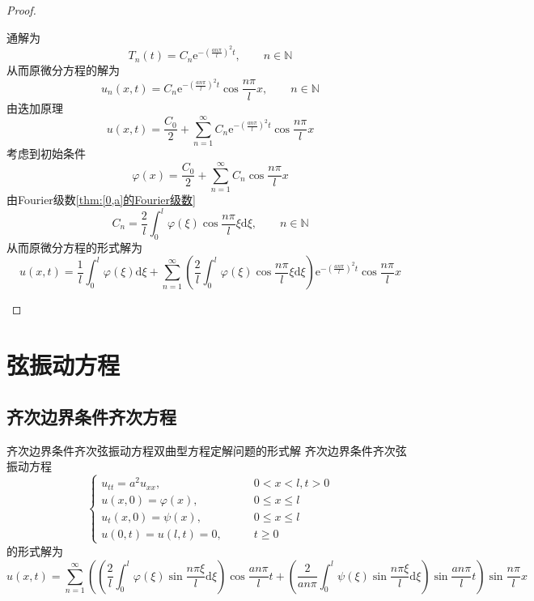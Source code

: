 \documentclass[lang = cn, scheme = chinese, thmcnt = section]{elegantbook}
\newcommand{\N}{\mathbb{N}}            %
\newcommand{\dd}{\mathrm{d}}           %
\newcommand{\ee}[1]{\mathrm{e}^{#1}}   %
\begin{document}
\begin{proof}
\begin{enumerate}
$$		$$
		通解为
		$$
		T_n(t)=C_n\ee{-\left(\frac{an\pi}{l}\right)^2t},\qquad n\in\N
		$$
		从而原微分方程的解为
		$$
		u_n(x,t)
		=C_n\ee{-\left(\frac{an\pi}{l}\right)^2t}\cos\frac{n\pi}{l}x,\qquad 
		n\in\N
		$$
		由迭加原理
		$$
		u(x,t)=\frac{C_0}{2}+\sum_{n=1}^{\infty}C_n\ee{-\left(\frac{an\pi}{l}\right)^2t}\cos\frac{n\pi}{l}x
		$$
		考虑到初始条件
		$$
		\varphi(x)=\frac{C_0}{2}+\sum_{n=1}^{\infty}C_n\cos\frac{n\pi}{l}x
		$$
		由Fourier级数\ref{thm:[0,a]的Fourier级数}
		$$
		C_n=\frac{2}{l}\int_0^l\varphi(\xi)\cos\frac{n\pi }{l}\xi\dd \xi,\qquad n\in\N
		$$
		从而原微分方程的形式解为
		$$
		u(x,t)=\frac{1}{l}\int_0^l\varphi(\xi)\dd \xi+\sum_{n=1}^{\infty}\left(\frac{2}{l}\int_0^l\varphi(\xi)\cos\frac{n\pi }{l}\xi\dd \xi\right)\ee{-\left(\frac{an\pi}{l}\right)^2t}\cos\frac{n\pi}{l}x
		$$
	\end{enumerate}
\end{proof}

\section{弦振动方程}

\subsection{齐次边界条件齐次方程}

\begin{theorem}{齐次边界条件齐次弦振动方程}{双曲型方程定解问题的形式解}
	齐次边界条件齐次弦振动方程
	$$
	\begin{cases}
		u_{tt}=a^2u_{xx},\qquad & 0<x<l,t>0\\
		u(x,0)=\varphi(x),\qquad & 0\le x\le l\\
		u_t(x,0)=\psi(x),\qquad & 0\le x\le l\\
		u(0,t)=u(l,t)=0,\qquad & t\ge 0
	\end{cases}
	$$
	的形式解为
	$$
	u(x,t)=\sum_{n=1}^{\infty}\left(\left(\frac{2}{l}\int_0^l\varphi(\xi)\sin\frac{n\pi \xi}{l}\dd \xi\right)\cos\frac{an\pi}{l}t+\left(\frac{2}{an\pi}\int_0^l\psi(\xi)\sin\frac{n\pi \xi}{l}\dd \xi\right)\sin \frac{an\pi}{l}t\right)\sin\frac{n\pi}{l}x
	$$
\end{theorem}
\end{document}
